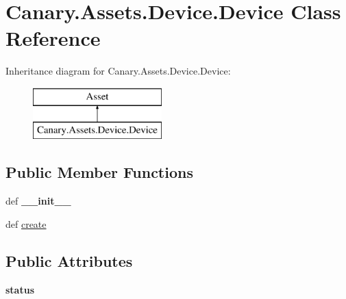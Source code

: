 \hypertarget{class_canary_8_assets_1_1_device_1_1_device}{\section{Canary.\-Assets.\-Device.\-Device Class Reference}
\label{class_canary_8_assets_1_1_device_1_1_device}
}
Inheritance diagram for Canary.\-Assets.\-Device.\-Device\-:\begin{figure}[H]
\begin{center}
\leavevmode
\includegraphics[height=2.000000cm]{class_canary_8_assets_1_1_device_1_1_device}
\end{center}
\end{figure}
\subsection*{Public Member Functions}
\begin{DoxyCompactItemize}
\item 
\hypertarget{class_canary_8_assets_1_1_device_1_1_device_a5067811b8f9a04987777030f9f6f3032}{def {\bfseries \-\_\-\-\_\-init\-\_\-\-\_\-}}\label{class_canary_8_assets_1_1_device_1_1_device_a5067811b8f9a04987777030f9f6f3032}

\item 
def \hyperlink{class_canary_8_assets_1_1_device_1_1_device_a836d00a0f2ae554f3e6ed5b391179621}{create}
\end{DoxyCompactItemize}
\subsection*{Public Attributes}
\begin{DoxyCompactItemize}
\item 
\hypertarget{class_canary_8_assets_1_1_device_1_1_device_aae4a32b115e7de9295524db7cce18eea}{{\bfseries status}}\label{class_canary_8_assets_1_1_device_1_1_device_aae4a32b115e7de9295524db7cce18eea}

\end{DoxyCompactItemize}


